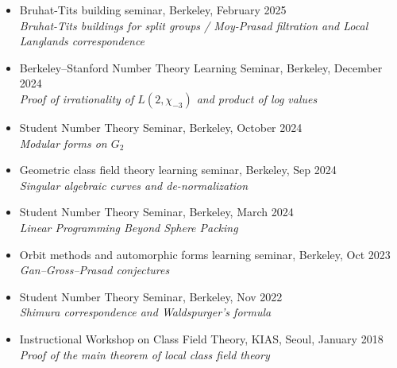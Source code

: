 \documentclass[letterpaper,11pt]{article}
\begin{document}
\begin{itemize}
\begin{itemize}
		{\color{muted}\textit{How Do Automorphic Forms and Elliptic Curves Fly? (Survey on Murmuration)}}
		\item Bruhat-Tits building seminar, Berkeley, February 2025 \\
		{\color{muted}\textit{Bruhat-Tits buildings for split groups / Moy-Prasad filtration and Local Langlands correspondence}}
		\item Berkeley--Stanford Number Theory Learning Seminar, Berkeley, December 2024 \\
		{\color{muted}\textit{Proof of irrationality of $L(2, \chi_{-3})$ and product of log values}}
		\item Student Number Theory Seminar, Berkeley, October 2024 \\
		{\color{muted}\textit{Modular forms on $G_2$}}
		\item Geometric class field theory learning seminar, Berkeley, Sep 2024 \\
		{\color{muted}\textit{Singular algebraic curves and de-normalization}}
		\item Student Number Theory Seminar, Berkeley, March 2024 \\
		{\color{muted}\textit{Linear Programming Beyond Sphere Packing}}
		\item Orbit methods and automorphic forms learning seminar, Berkeley, Oct 2023 \\
		{\color{muted}\textit{Gan--Gross--Prasad conjectures}}
		\item Student Number Theory Seminar, Berkeley, Nov 2022 \\
		{\color{muted}\textit{Shimura correspondence and Waldspurger's formula}}
		\item Instructional Workshop on Class Field Theory, KIAS, Seoul, January 2018 \\
		{\color{muted}\textit{Proof of the main theorem of local class field theory}}
	\end{itemize}
\end{itemize}
\end{document}
